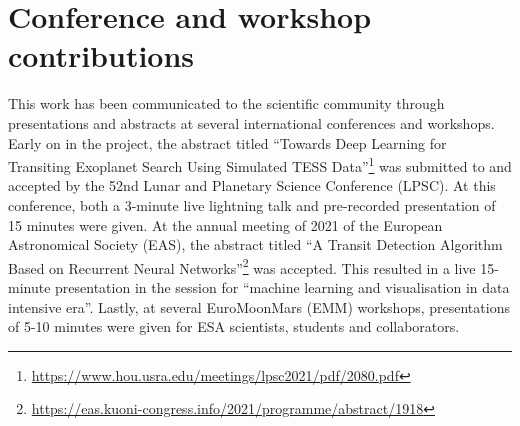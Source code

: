 
\section{Conference and workshop contributions}


This work has been communicated to the scientific community through presentations and abstracts at several international conferences and workshops. Early on in the project, the abstract titled ``Towards Deep Learning for Transiting Exoplanet Search Using Simulated TESS Data''\footnote{\url{https://www.hou.usra.edu/meetings/lpsc2021/pdf/2080.pdf}} \citep{rusticus2021towards} was submitted to and accepted by the 52nd Lunar and Planetary Science Conference (LPSC). At this conference, both a 3-minute live lightning talk and pre-recorded presentation of 15 minutes were given. At the annual meeting of 2021 of the European Astronomical Society (EAS), the abstract titled ``A Transit Detection Algorithm Based on Recurrent Neural Networks''\footnote{\url{https://eas.kuoni-congress.info/2021/programme/abstract/1918}} was accepted. This resulted in a live 15-minute presentation in the session for ``machine learning and visualisation in data intensive era''. Lastly, at several EuroMoonMars (EMM) workshops, presentations of 5-10 minutes were given for ESA scientists, students and collaborators.